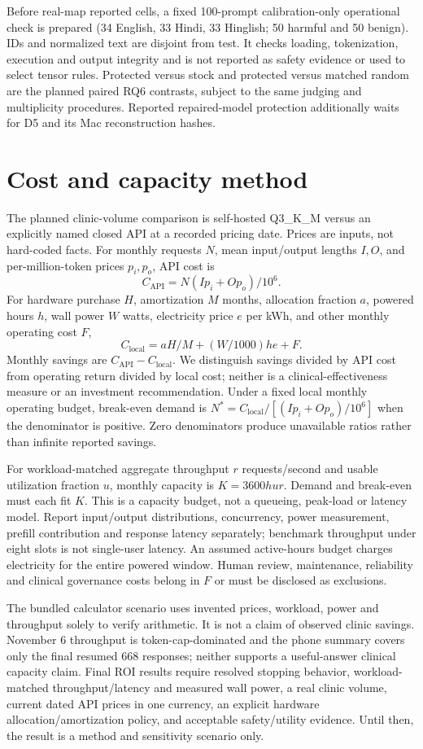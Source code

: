 Before real-map reported cells, a fixed 100-prompt calibration-only operational check is prepared (34 English, 33 Hindi, 33 Hinglish; 50 harmful and 50 benign). IDs and normalized text are disjoint from test. It checks loading, tokenization, execution and output integrity and is not reported as safety evidence or used to select tensor rules. Protected versus stock and protected versus matched random are the planned paired RQ6 contrasts, subject to the same judging and multiplicity procedures. Reported repaired-model protection additionally waits for D5 and its Mac reconstruction hashes.

\section{Cost and capacity method}

The planned clinic-volume comparison is self-hosted Q3\_K\_M versus an explicitly named closed API at a recorded pricing date. Prices are inputs, not hard-coded facts. For monthly requests $N$, mean input/output lengths $I,O$, and per-million-token prices $p_i,p_o$, API cost is
\[
C_{\mathrm{API}}=N(Ip_i+Op_o)/10^6.
\]
For hardware purchase $H$, amortization $M$ months, allocation fraction $a$, powered hours $h$, wall power $W$ watts, electricity price $e$ per kWh, and other monthly operating cost $F$,
\[
C_{\mathrm{local}}=aH/M+(W/1000)he+F.
\]
Monthly savings are $C_{\mathrm{API}}-C_{\mathrm{local}}$. We distinguish savings divided by API cost from operating return divided by local cost; neither is a clinical-effectiveness measure or an investment recommendation. Under a fixed local monthly operating budget, break-even demand is $N^*=C_{\mathrm{local}}/[(Ip_i+Op_o)/10^6]$ when the denominator is positive. Zero denominators produce unavailable ratios rather than infinite reported savings.

For workload-matched aggregate throughput $r$ requests/second and usable utilization fraction $u$, monthly capacity is $K=3600hur$. Demand and break-even must each fit $K$. This is a capacity budget, not a queueing, peak-load or latency model. Report input/output distributions, concurrency, power measurement, prefill contribution and response latency separately; benchmark throughput under eight slots is not single-user latency. An assumed active-hours budget charges electricity for the entire powered window. Human review, maintenance, reliability and clinical governance costs belong in $F$ or must be disclosed as exclusions.

The bundled calculator scenario uses invented prices, workload, power and throughput solely to verify arithmetic. It is not a claim of observed clinic savings. November 6 throughput is token-cap-dominated and the phone summary covers only the final resumed 668 responses; neither supports a useful-answer clinical capacity claim. Final ROI results require resolved stopping behavior, workload-matched throughput/latency and measured wall power, a real clinic volume, current dated API prices in one currency, an explicit hardware allocation/amortization policy, and acceptable safety/utility evidence. Until then, the result is a method and sensitivity scenario only.
